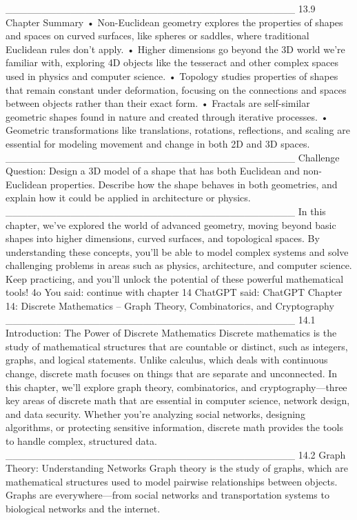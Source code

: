 ________________________________________
13.9 Chapter Summary
•	Non-Euclidean geometry explores the properties of shapes and spaces on curved surfaces, like spheres or saddles, where traditional Euclidean rules don’t apply.
•	Higher dimensions go beyond the 3D world we’re familiar with, exploring 4D objects like the tesseract and other complex spaces used in physics and computer science.
•	Topology studies properties of shapes that remain constant under deformation, focusing on the connections and spaces between objects rather than their exact form.
•	Fractals are self-similar geometric shapes found in nature and created through iterative processes.
•	Geometric transformations like translations, rotations, reflections, and scaling are essential for modeling movement and change in both 2D and 3D spaces.
________________________________________
Challenge Question:
Design a 3D model of a shape that has both Euclidean and non-Euclidean properties. Describe how the shape behaves in both geometries, and explain how it could be applied in architecture or physics.
________________________________________
In this chapter, we’ve explored the world of advanced geometry, moving beyond basic shapes into higher dimensions, curved surfaces, and topological spaces. By understanding these concepts, you’ll be able to model complex systems and solve challenging problems in areas such as physics, architecture, and computer science. Keep practicing, and you’ll unlock the potential of these powerful mathematical tools!
4o
You said:
continue with chapter 14
ChatGPT said:
ChatGPT
Chapter 14: Discrete Mathematics – Graph Theory, Combinatorics, and Cryptography
________________________________________
14.1 Introduction: The Power of Discrete Mathematics
Discrete mathematics is the study of mathematical structures that are countable or distinct, such as integers, graphs, and logical statements. Unlike calculus, which deals with continuous change, discrete math focuses on things that are separate and unconnected.
In this chapter, we’ll explore graph theory, combinatorics, and cryptography—three key areas of discrete math that are essential in computer science, network design, and data security. Whether you’re analyzing social networks, designing algorithms, or protecting sensitive information, discrete math provides the tools to handle complex, structured data.
________________________________________
14.2 Graph Theory: Understanding Networks
Graph theory is the study of graphs, which are mathematical structures used to model pairwise relationships between objects. Graphs are everywhere—from social networks and transportation systems to biological networks and the internet.
